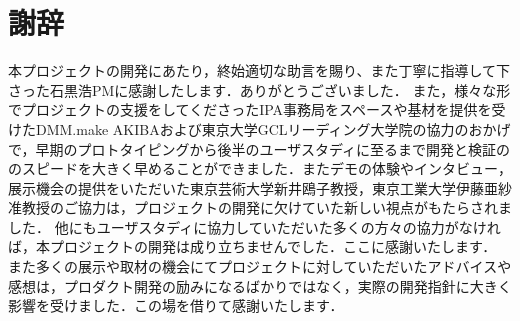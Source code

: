 \section{謝辞}
本プロジェクトの開発にあたり，終始適切な助言を賜り、また丁寧に指導して下さった石黒浩PMに感謝したします．ありがとうございました．
また，様々な形でプロジェクトの支援をしてくださったIPA事務局をスペースや基材を提供を受けたDMM.make AKIBAおよび東京大学GCLリーディング大学院の協力のおかげで，早期のプロトタイピングから後半のユーザスタディに至るまで開発と検証ののスピードを大きく早めることができました．またデモの体験やインタビュー，展示機会の提供をいただいた東京芸術大学新井鴎子教授，東京工業大学伊藤亜紗准教授のご協力は，プロジェクトの開発に欠けていた新しい視点がもたらされました．
他にもユーザスタディに協力していただいた多くの方々の協力がなければ，本プロジェクトの開発は成り立ちませんでした．ここに感謝いたします．
また多くの展示や取材の機会にてプロジェクトに対していただいたアドバイスや感想は，プロダクト開発の励みになるばかりではなく，実際の開発指針に大きく影響を受けました．この場を借りて感謝いたします．
